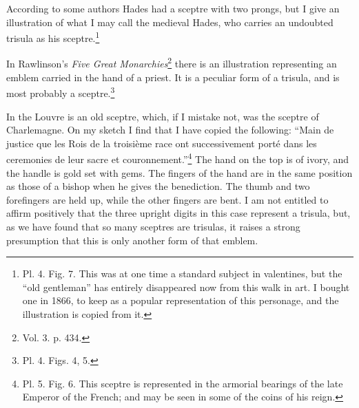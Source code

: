 \documentclass[a4paper, 11pt, oneside, english, landscape, twocolumn]{article}
\begin{document}
According to some authors Hades had a sceptre with two prongs, but I give an illustration of what I may call the medieval Hades, who carries an undoubted trisula as his sceptre.\footnote{Pl. 4. Fig. 7. This was at one time a standard subject in valentines, but the ``old gentleman'' has entirely disappeared now from this walk in art. I bought one in 1866, to keep as a popular representation of this personage, and the illustration is copied from it.}

In Rawlinson's \emph{Five Great Monarchies}\footnote{Vol. 3. p. 434.} there is an illustration representing an emblem carried in the hand of a priest. It is a peculiar form of a trisula, and is most probably a sceptre.\footnote{Pl. 4. Figs. 4, 5.}

In the Louvre is an old sceptre, which, if I mistake not, was the sceptre of Charlemagne. On my sketch I find that I have copied the following: ``Main de justice que les Rois de la troisième race ont successivement porté dans les ceremonies de leur sacre et couronnement.''\footnote{Pl. 5. Fig. 6. This sceptre is represented in the armorial bearings of the late Emperor of the French; and may be seen in some of the coins of his reign.} The hand on the top is of ivory, and the handle is gold set with gems. The fingers of the hand are in the same position as those of a bishop when he gives the benediction. The thumb and two forefingers are held up, while the other fingers are bent. I am not entitled to affirm positively that the three upright digits in this case represent a trisula, but, as we have found that so many sceptres are trisulas, it raises a strong presumption that this is only another form of that emblem.
\end{document}
